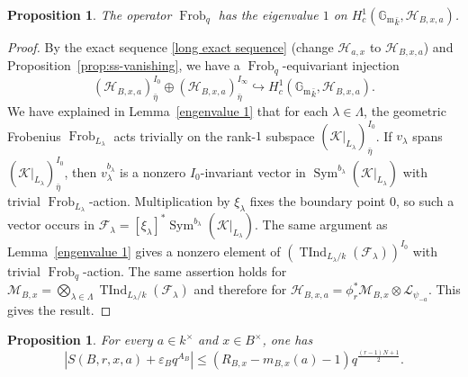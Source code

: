 \documentclass[11pt]{amsart}
\newtheorem{proposition}[theorem]{Proposition}
\theoremstyle{remark}
\newcommand{\Gm}{\mathbb G_{\mathrm m}}
\newcommand{\Frob}{\operatorname{Frob}}
\newcommand{\TInd}{\operatorname{TInd}}
\newcommand{\Sym}{\operatorname{Sym}}
\newcommand{\cF}{\mathcal F}
\newcommand{\cK}{\mathcal K}
\newcommand{\cL}{\mathcal L}
\newcommand{\cH}{\mathcal H}
\begin{document}
\begin{proposition}\label{prop:ss-boundary-eigenvalue}
The operator $\Frob_q$ has the eigenvalue $1$ on
$H_c^1({\Gm}_{\bar{k}},\cH_{B,x,a})$.
\end{proposition}

\begin{proof}
By the exact sequence \eqref{long exact sequence} (change $\cH_{a,x}$ to $\cH_{B,x,a}$) and Proposition~\ref{prop:ss-vanishing}, we have a $\Frob_q$-equivariant injection
\[
(\cH_{B,x,a})_{\bar{\eta}}^{I_0}\oplus(\cH_{B,x,a})_{\bar{\eta}}^{I_\infty}
\hookrightarrow H_c^1({\Gm}_{\bar{k}},\cH_{B,x,a}).
\]
We have explained in Lemma~\ref{engenvalue 1} that for each $\lambda\in\Lambda$, the geometric Frobenius $\Frob_{L_{\lambda}}$ acts trivially on the rank-$1$ subspace $\left(\cK|_{L_{\lambda}}\right)_{\bar{\eta}}^{I_0}$. If $v_{\lambda}$ spans $\left(\cK|_{L_{\lambda}}\right)_{\bar{\eta}}^{I_0}$,
then $v_{\lambda}^{b_{\lambda}}$ is a nonzero $I_0$-invariant vector in
$\Sym^{b_{\lambda}}(\cK|_{L_{\lambda}})$ with trivial $\Frob_{L_{\lambda}}$-action. Multiplication by $\xi_{\lambda}$ fixes the boundary point $0$, so such a vector occurs in $\cF_{\lambda}=[\xi_{\lambda}]^*
\Sym^{b_{\lambda}}(\cK|_{L_{\lambda}})$. The same argument as Lemma~\ref{engenvalue 1} gives a nonzero element of $\left(\TInd_{L_{\lambda}/k}(\cF_{\lambda})\right)^{I_0}$ with trivial $\Frob_q$-action. The same assertion holds for $\mathcal{M}_{B,x}=
\bigotimes_{\lambda\in\Lambda}\TInd_{L_{\lambda}/k}(\cF_{\lambda})$ and therefore for $\cH_{B,x,a}=\phi_r^*\mathcal{M}_{B,x}\otimes\cL_{\psi_{-a}}$. This gives the result.
\end{proof}

\begin{proposition}\label{prop:ss-trace-estimate}
For every $a\in k^{\times}$ and $x\in B^{\times}$, one has
\begin{equation}\label{eq:ss-trace-estimate}
\left|S(B,r,x,a)+\varepsilon_Bq^{A_B}\right|
\leq\left(R_{B,x}-m_{B,x}(a)-1\right)
 q^{\frac{(r-1)N+1}{2}}.
\end{equation}
\end{proposition}
\end{document}

